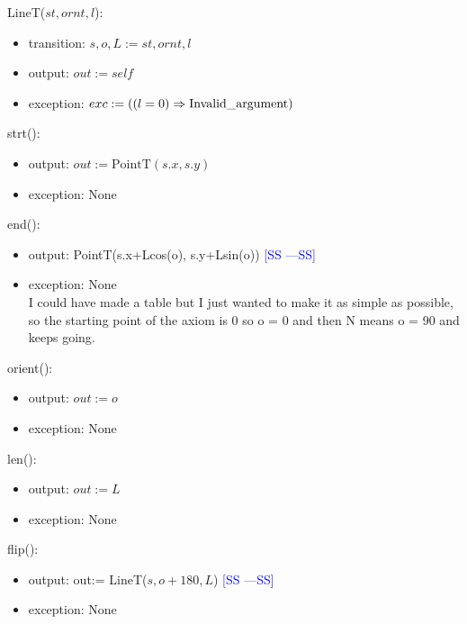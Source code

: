 \documentclass[12pt]{article}
\newcommand{\authornote}[3]{\textcolor{#1}{[#3 ---#2]}}
\newcommand{\authornote}[3]{}
\newcommand{\wss}[1]{\authornote{blue}{SS}{#1}}
\begin{document}
LineT($st, ornt, l$):
\begin{itemize}
\item transition: $s, o, L := st, ornt, l$
\item output: $out := \mathit{self}$
\item exception: $exc:= ((l = 0) \Rightarrow \mbox{Invalid\textunderscore argument})$
\end{itemize}

\noindent strt():
\begin{itemize}
\item output: $out := \mbox{PointT}(s.x, s.y)$
\item exception: None
\end{itemize}

\noindent end():
\begin{itemize}
\item output: PointT(s.x+Lcos(o), s.y+Lsin(o)) \wss{SS}
\item exception: None\\
I could have made a table but I just wanted to make it as simple as possible, so the starting point of the axiom is 0 so o = 0  and then N means o = 90 and keeps going.
\end{itemize}

\noindent orient():
\begin{itemize}
\item output: $out := o$
\item exception: None
\end{itemize}

\noindent len():
\begin{itemize}
\item output: $out := L$
\item exception: None
\end{itemize}

\noindent flip():
\begin{itemize}
\item output: out:= LineT($s, o+180, L$) \wss{SS}
\item exception: None
\end{itemize}
\end{document}
